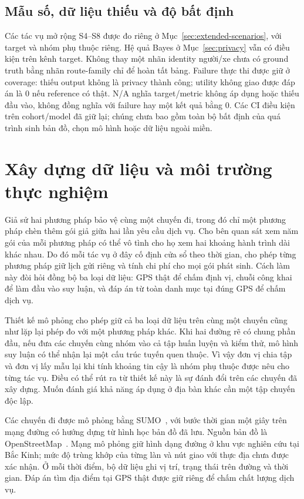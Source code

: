 \subsection{Mẫu số, dữ liệu thiếu và độ bất định}
Các tác vụ mở rộng S4--S8 được đo riêng ở Mục~\ref{sec:extended-scenarios}, với target và nhóm phụ thuộc
riêng. Hệ quả Bayes ở Mục~\ref{sec:privacy} vẫn có điều kiện trên kênh target. Không thay một nhãn
identity người/xe chưa có ground truth bằng nhãn route-family chỉ để hoàn tất bảng.
Failure thực thi được giữ ở coverage: thiếu output không là privacy thành công; utility không giao
được đáp án là 0 nếu reference có thật. N/A nghĩa target/metric không áp dụng hoặc thiếu đầu vào,
không đồng nghĩa với failure hay một kết quả bằng 0. Các CI điều kiện trên cohort/model đã giữ lại;
chúng chưa bao gồm toàn bộ bất định của quá trình sinh bản đồ, chọn mô hình hoặc dữ liệu ngoài miền.


\section{Xây dựng dữ liệu và môi trường thực nghiệm}
Giả sử hai phương pháp bảo vệ cùng một chuyến đi, trong đó chỉ một phương pháp chèn thêm
gói giả giữa hai lần yêu cầu dịch vụ. Cho bên quan sát xem năm gói của mỗi phương pháp có
thể vô tình cho họ xem hai khoảng hành trình dài khác nhau. Do đó mỗi tác vụ ở đây cố định
cửa sổ theo thời gian, cho phép từng phương pháp giữ lịch gửi riêng và tính chi phí cho mọi
gói phát sinh. Cách làm này đòi hỏi đồng bộ ba loại dữ liệu: GPS thật để chấm định vị, chuỗi
công khai để làm đầu vào suy luận, và đáp án từ toàn danh mục tại đúng GPS để chấm dịch vụ.

Thiết kế mô phỏng cho phép giữ cả ba loại dữ liệu trên cùng một chuyến cũng như lặp lại phép
đo với một phương pháp khác. Khi hai đường rẽ có chung phần đầu, nếu đưa các chuyến cùng nhóm
vào cả tập huấn luyện và kiểm thử, mô hình suy luận có thể nhận lại một cấu trúc tuyến quen
thuộc. Vì vậy đơn vị chia tập và đơn vị lấy mẫu lại khi tính khoảng tin cậy là nhóm phụ thuộc
được nêu cho từng tác vụ. Điều có thể rút ra từ thiết kế này là sự đánh đổi trên các chuyến
đã xây dựng. Muốn đánh giá khả năng áp dụng ở địa bàn khác cần một tập chuyến độc lập.

Các chuyến đi được mô phỏng bằng SUMO~\cite{sumo}, với bước thời gian một giây trên mạng đường có hướng dựng từ hình học bản đồ đã lưu. Nguồn bản đồ là OpenStreetMap~\cite{osm}. Mạng mô phỏng giữ hình dạng đường ở khu vực nghiên cứu tại Bắc Kinh; mức độ trùng khớp của từng làn và nút giao với thực địa chưa được xác nhận. Ở mỗi thời điểm, bộ dữ liệu ghi vị trí, trạng thái trên đường và thời gian. Đáp án tìm địa điểm tại GPS thật được giữ riêng để chấm chất lượng dịch vụ.


